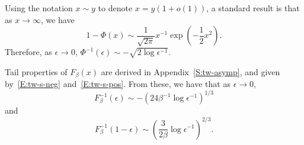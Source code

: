 \documentclass[final]{IEEEtran}
\begin{document}
Using the notation $x \sim y$ to denote $x = y\left( 1 + o(1) \right)$, a
standard result \cite{abramowitz1970hmf} is that as $x \to \infty$, we have
\[
    1 - \Phi(x)
    \sim
    \frac{1}{\sqrt{2 \pi}}
    x^{-1}
    \exp\left( -\frac{1}{2} x^2 \right).
\]
Therefore, as $\epsilon \to 0$,
\(
    \Phi^{-1} (\epsilon)
    \sim
    -
    \sqrt{ 2 \log \epsilon^{-1} }
\).

Tail properties of $F_\beta(x)$ are derived in Appendix~\ref{S:tw-asymp}, and given by~\eqref{E:tw-s-neg} and~\eqref{E:tw-s-pos}.  From these, we have that as $\epsilon \to 0$,
\[
    F_\beta^{-1} ( \epsilon )
    \sim
    -
    \left( 24 \beta^{-1} \log \epsilon^{-1} \right)^{1/3}
\]
and
\[
    F_\beta^{-1} ( 1 - \epsilon )
    \sim
    \left(
        \frac{3}{2 \beta}
        \log \epsilon^{-1}
    \right)^{2/3}.
\]
\end{document}
